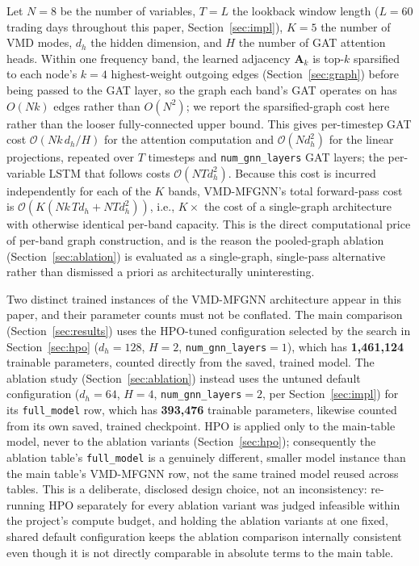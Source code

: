 \documentclass[journal]{IEEEtran}
\begin{document}
Let $N=8$ be the number of variables, $T=L$ the lookback window length ($L=60$ trading days throughout this paper, Section~\ref{sec:impl}), $K=5$ the number of VMD modes, $d_h$ the hidden dimension, and $H$ the number of GAT attention heads. Within one frequency band, the learned adjacency $\mathbf{A}_k$ is top-$k$ sparsified to each node's $k=4$ highest-weight outgoing edges (Section~\ref{sec:graph}) before being passed to the GAT layer, so the graph each band's GAT operates on has $O(Nk)$ edges rather than $O(N^2)$; we report the sparsified-graph cost here rather than the looser fully-connected upper bound. This gives per-timestep GAT cost $\mathcal{O}(Nk\,d_h/H)$ for the attention computation and $\mathcal{O}(N d_h^2)$ for the linear projections, repeated over $T$ timesteps and \texttt{num\_gnn\_layers} GAT layers; the per-variable LSTM that follows costs $\mathcal{O}(N T d_h^2)$. Because this cost is incurred independently for each of the $K$ bands, VMD-MFGNN's total forward-pass cost is $\mathcal{O}(K(Nk\,T d_h + N T d_h^2))$, i.e., $K\times$ the cost of a single-graph architecture with otherwise identical per-band capacity. This is the direct computational price of per-band graph construction, and is the reason the pooled-graph ablation (Section~\ref{sec:ablation}) is evaluated as a single-graph, single-pass alternative rather than dismissed a priori as architecturally uninteresting.

Two distinct trained instances of the VMD-MFGNN architecture appear in this paper, and their parameter counts must not be conflated. The main comparison (Section~\ref{sec:results}) uses the HPO-tuned configuration selected by the search in Section~\ref{sec:hpo} ($d_h=128$, $H=2$, \texttt{num\_gnn\_layers}$=1$), which has \textbf{1{,}461{,}124} trainable parameters, counted directly from the saved, trained model. The ablation study (Section~\ref{sec:ablation}) instead uses the untuned default configuration ($d_h=64$, $H=4$, \texttt{num\_gnn\_layers}$=2$, per Section~\ref{sec:impl}) for its \texttt{full\_model} row, which has \textbf{393{,}476} trainable parameters, likewise counted from its own saved, trained checkpoint. HPO is applied only to the main-table model, never to the ablation variants (Section~\ref{sec:hpo}); consequently the ablation table's \texttt{full\_model} is a genuinely different, smaller model instance than the main table's VMD-MFGNN row, not the same trained model reused across tables. This is a deliberate, disclosed design choice, not an inconsistency: re-running HPO separately for every ablation variant was judged infeasible within the project's compute budget, and holding the ablation variants at one fixed, shared default configuration keeps the ablation comparison internally consistent even though it is not directly comparable in absolute terms to the main table.
\end{document}

